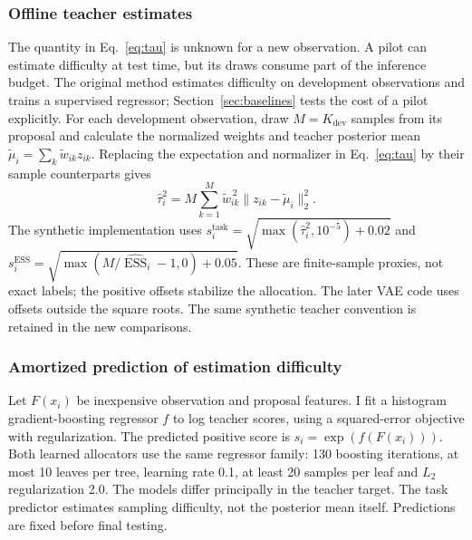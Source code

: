\documentclass[10pt,letterpaper]{article}
\newcommand{\norm}[1]{\lVert #1\rVert_2}
\newcommand{\ESS}{\operatorname{ESS}}
\newcommand{\dev}{K_{\mathrm{dev}}}
\newcommand{\task}{\mathrm{task}}
\begin{document}
\subsubsection{Offline teacher estimates}
The quantity in Eq.~\eqref{eq:tau} is unknown for a new observation. A pilot can estimate difficulty at test time, but its draws consume part of the inference budget. The original method estimates difficulty on development observations and trains a supervised regressor; Section~\ref{sec:baselines} tests the cost of a pilot explicitly. For each development observation, draw $M=\dev$ samples from its proposal and calculate the normalized weights and teacher posterior mean $\widetilde\mu_i=\sum_k\widetilde w_{ik}z_{ik}$. Replacing the expectation and normalizer in Eq.~\eqref{eq:tau} by their sample counterparts gives
\begin{equation}
 \widehat\tau_i^2=M\sum_{k=1}^{M}\widetilde w_{ik}^{\,2}\norm{z_{ik}-\widetilde\mu_i}^2.
 \label{eq:teacher}
\end{equation}
The synthetic implementation uses $s_i^{\task}=\sqrt{\max(\widehat\tau_i^2,10^{-5})+0.02}$ and $s_i^{\mathrm{ESS}}=\sqrt{\max(M/\widehat{\ESS}_i-1,0)+0.05}$. These are finite-sample proxies, not exact labels; the positive offsets stabilize the allocation. The later VAE code uses offsets outside the square roots. The same synthetic teacher convention is retained in the new comparisons.
\subsubsection{Amortized prediction of estimation difficulty}
Let $F(x_i)$ be inexpensive observation and proposal features. I fit a histogram gradient-boosting regressor $f$ to log teacher scores, using a squared-error objective with regularization. The predicted positive score is $s_i=\exp(f(F(x_i)))$. Both learned allocators use the same regressor family: 130 boosting iterations, at most 10 leaves per tree, learning rate 0.1, at least 20 samples per leaf and $L_2$ regularization 2.0. The models differ principally in the teacher target. The task predictor estimates sampling difficulty, not the posterior mean itself. Predictions are fixed before final testing.
\end{document}
